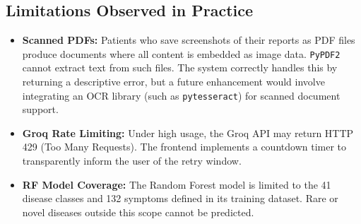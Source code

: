 \subsection{Limitations Observed in Practice}
\begin{itemize}
    \item \textbf{Scanned PDFs:} Patients who save screenshots of their reports as PDF files produce documents where all content is embedded as image data. \texttt{PyPDF2} cannot extract text from such files. The system correctly handles this by returning a descriptive error, but a future enhancement would involve integrating an OCR library (such as \texttt{pytesseract}) for scanned document support.
    \item \textbf{Groq Rate Limiting:} Under high usage, the Groq API may return HTTP 429 (Too Many Requests). The frontend implements a countdown timer to transparently inform the user of the retry window.
    \item \textbf{RF Model Coverage:} The Random Forest model is limited to the 41 disease classes and 132 symptoms defined in its training dataset. Rare or novel diseases outside this scope cannot be predicted.
\end{itemize}
